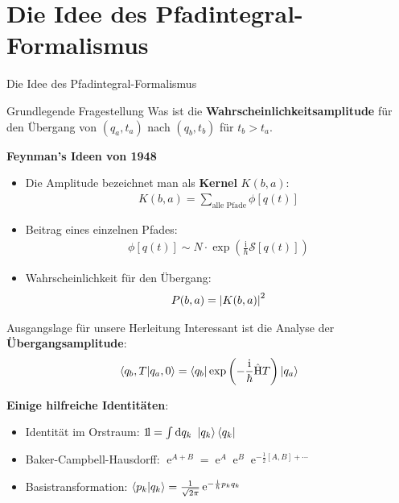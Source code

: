 \section{Die Idee des Pfadintegral-Formalismus}
\begin{frame}{Die Idee des Pfadintegral-Formalismus}

\begin{block}{Grundlegende Fragestellung}
	Was ist die \textbf{Wahrscheinlichkeitsamplitude} für den Übergang von $(q_a, t_a)$ nach $(q_b, t_b)$ für $t_b>t_a$.  
\end{block}
\textbf{Feynman's Ideen von 1948}
\begin{itemize}
	\item Die Amplitude bezeichnet man als \textbf{Kernel }$K(b,a)$:
	\begin{align*}
		K(b,a) = \sum_{\text{alle Pfade}}\phi[q(t)]
	\end{align*}
	\item Beitrag eines einzelnen Pfades:
	\begin{align*}
		\phi[q(t)] \sim N \cdot \exp\left(\frac{\mathrm{i}}{\hbar}\mathcal{S}[q(t)]\right) 
	\end{align*}
	\item  Wahrscheinlichkeit für den Übergang:
	\begin{align*}
	 P(b,a) = \abs{K(b,a)}^2 
	 \end{align*}
\end{itemize}
\end{frame}


\begin{frame}{Ausgangslage für unsere Herleitung}
Interessant ist die Analyse der \textbf{Übergangsamplitude}:
\begin{align*}
\braket{q_b,T}{q_a,0} = \bra{q_b}\exp\left(-\frac{\mathrm{i}}{\hbar} \hat{\text{H}}T\right)\ket{q_a}
\end{align*}

\textbf{Einige hilfreiche Identitäten}:
\vfill 
\begin{itemize}
\item Identität im Orstraum: $\mathrm{1\!l} = \int\dd q_k \ \ket{q_k}\bra{q_k} $
\vfill 
\item Baker-Campbell-Hausdorff: $\operatorname{e}^{A+B} = \operatorname{e}^{A}\operatorname{e}^{B}\operatorname{e}^{-\frac{1}{2}[A,B] + \cdots} $
\vfill 
\item Basistransformation: $\braket{p_k}{q_k} = \frac{1}{\sqrt{2\pi}}\operatorname{e}^{-{\frac{\mathrm{i}}{\hbar}p_kq_k}}$
\end{itemize}
\end{frame}

